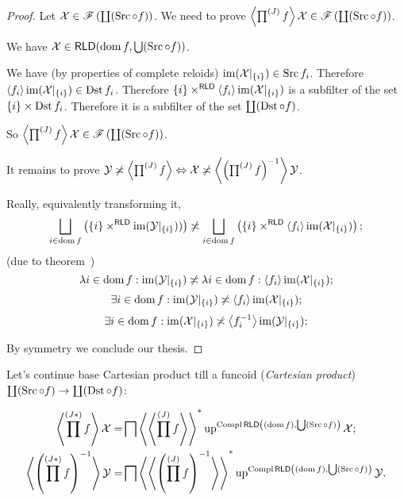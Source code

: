 \begin{proof}
Let $\mathcal{X}\in\mathscr{F}\left(\coprod(\operatorname{Src}\circ f)\right)$.
We need to prove
$\left\langle \prod^{(J)}f\right\rangle \mathcal{X}\in\mathscr{F}\left(\coprod(\operatorname{Src}\circ f)\right)$.

We have $\mathcal{X}\in\mathsf{RLD}(\operatorname{dom} f, \bigcup(\operatorname{Src}\circ f))$.

We have (by properties of complete reloids) $\operatorname{im}(\mathcal{X}|_{\{i\}})\in\operatorname{Src} f_i$. Therefore $\left\langle f_i\right\rangle\operatorname{im}(\mathcal{X}|_{\{i\}})\in\operatorname{Dst} f_i$. Therefore
$\{i\}\times^{\mathsf{RLD}}\left\langle f_i\right\rangle\operatorname{im}(\mathcal{X}|_{\{i\}})$ is a subfilter of the set $\{i\}\times\operatorname{Dst} f_i$. Therefore it is a subfilter of the set $\coprod(\operatorname{Dst}\circ f)$.

So $\left\langle \prod^{(J)}f\right\rangle \mathcal{X}\in\mathscr{F}\left(\coprod(\operatorname{Src}\circ f)\right)$.

It remains to prove
$\mathcal{Y}\not\asymp\left\langle \prod^{(J)}f\right\rangle \Leftrightarrow
\mathcal{X}\not\asymp\left\langle \left(\prod^{(J)}f\right)^{-1}\right\rangle \mathcal{Y}$.

Really, equivalently transforming it, \[ \bigsqcup_{i\in\dom f}
\left(\{i\}\times^{\mathsf{RLD}}\im(\mathcal{Y}|_{\{i\}}))\right) \nasymp \bigsqcup_{i\in\dom f}
\left(\{i\}\times^{\mathsf{RLD}}\supfun{f_i}\im(\mathcal{X}|_{\{i\}})\right); \]
(due to theorem~)
\[
\lambda i\in\operatorname{dom} f:\operatorname{im}(\mathcal{Y}|_{\{i\}}) \not\asymp
\lambda i\in\operatorname{dom} f:\left\langle f_i\right\rangle\operatorname{im}(\mathcal{X}|_{\{i\}});
\]
\[
\exists i\in\operatorname{dom} f:\operatorname{im}(\mathcal{Y}|_{\{i\}}) \not\asymp
\left\langle f_i\right\rangle\operatorname{im}(\mathcal{X}|_{\{i\}});
\]
\[
\exists i\in\operatorname{dom} f:\operatorname{im}(\mathcal{X}|_{\{i\}}) \not\asymp
\left\langle f_i^{-1}\right\rangle\operatorname{im}(\mathcal{Y}|_{\{i\}});
\]

By symmetry we conclude our thesis.
\end{proof}

\begin{defn}
Let's continue base Cartesian product till
a funcoid (\emph{Cartesian product}) $\coprod(\operatorname{Src}\circ f)\to\coprod(\operatorname{Dst}\circ f)$:
\end{defn}

\begin{align*}
\left\langle \prod^{(J\ast)} f\right\rangle\mathcal{X} =&
\bigsqcap\left\langle \left\langle \prod^{(J)}f\right\rangle\right\rangle ^{\ast}\operatorname{up}^{\operatorname{Compl}\mathsf{RLD}\left((\operatorname{dom} f),\bigcup(\operatorname{Src}\circ f)\right)}\mathcal{X};\\
\left\langle \left(\prod^{(J\ast)} f\right)^{-1}\right\rangle\mathcal{Y} =&
\bigsqcap\left\langle \left\langle \left(\prod^{(J)}f\right)^{-1}\right\rangle\right\rangle ^{\ast}\operatorname{up}^{\operatorname{Compl}\mathsf{RLD}\left((\operatorname{dom} f),\bigcup(\operatorname{Src}\circ f)\right)}\mathcal{Y}.
\end{align*}

